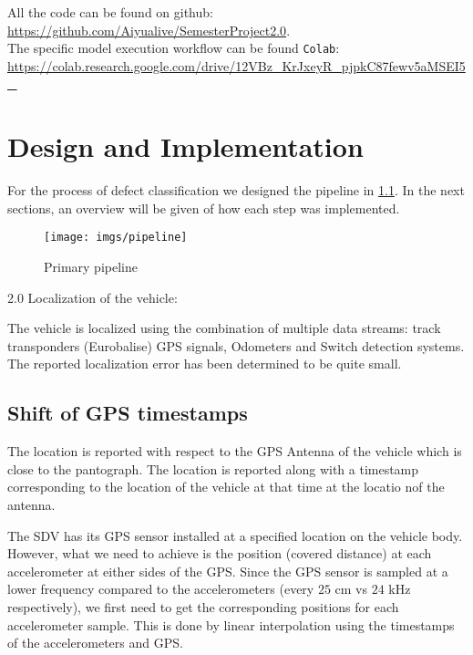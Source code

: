 \noindent All the code can be found on github: \\
\url{https://github.com/Aiyualive/SemesterProject2.0}.\\

\noindent The specific model execution workflow can be found \verb|Colab|:\\
\url{https://colab.research.google.com/drive/12VBz_KrJxeyR_pjpkC87fewv5aMSEI5_}



\chapter{Design and Implementation}

For the process of defect classification we designed the pipeline in \ref{fig:pipeline}. In the next sections, an overview will be given of how each step was implemented.
\begin{figure}[H]
	\centering
	\texttt{[image: imgs/pipeline]}
	\caption{Primary pipeline}
	\label{fig:pipeline}
\end{figure}



2.0 Localization of the vehicle:

The vehicle is localized using the combination of multiple data streams: track transponders (Eurobalise) GPS signals, Odometers and Switch detection systems. The reported localization error has been determined to be quite small.

\section{Shift of GPS timestamps}
The location is reported with respect to the GPS Antenna of the vehicle which is close to the pantograph. The location is reported along with a timestamp corresponding to the location of the vehicle at that time at the locatio nof the antenna. 

The SDV has its GPS sensor installed at a specified location on the vehicle body. However, what we need to achieve is the position (covered distance) at each accelerometer at either sides of the GPS. Since the GPS sensor is sampled at a lower frequency compared to the accelerometers (every $25$ cm vs $24$ kHz respectively), we first need to get the corresponding positions for each accelerometer sample. This is done by linear interpolation using the timestamps of the accelerometers and GPS. 

